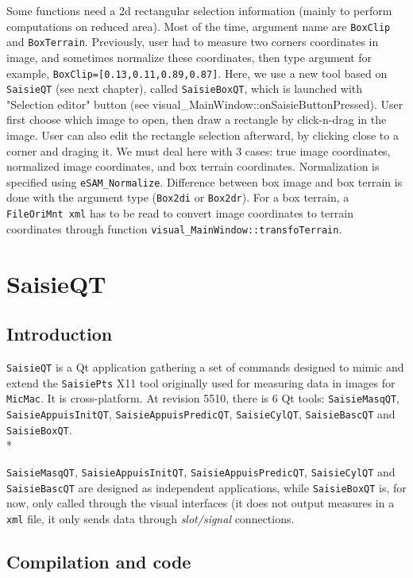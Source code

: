 \documentclass[a4paper]{book}
\begin{document}
Some functions need a 2d rectangular selection information (mainly to perform computations on reduced area). Most of the time, argument name are {\tt BoxClip} and {\tt BoxTerrain}. Previously, user had to measure two corners coordinates in image, and sometimes normalize these coordinates, then type argument for example, {\tt BoxClip=[0.13,0.11,0.89,0.87]}. Here, we use a new tool based on {\tt SaisieQT} (see next chapter), called {\tt SaisieBoxQT}, which is launched with "Selection editor" button (see visual\_MainWindow::onSaisieButtonPressed). User first choose which image to open, then draw a rectangle by click-n-drag in the image. User can also edit the rectangle selection afterward, by clicking close to a corner and draging it.
We must deal here with 3 cases: true image coordinates, normalized image coordinates, and box terrain coordinates.
Normalization is specified using {\tt eSAM\_Normalize}. Difference between box image and box terrain is done with the argument type ({\tt Box2di} or {\tt Box2dr}). For a box terrain, a {\tt FileOriMnt xml} has to be read to convert image coordinates to terrain coordinates through function {\tt visual\_MainWindow::transfoTerrain}.

\section{SaisieQT}

\subsection{Introduction}

{\tt SaisieQT} is a Qt application gathering a set of commands designed to mimic and extend the {\tt SaisiePts} X11 tool originally used for measuring data in images for {\tt MicMac}. It is cross-platform.
At revision 5510, there is 6 Qt tools: {\tt SaisieMasqQT}, {\tt SaisieAppuisInitQT}, {\tt SaisieAppuisPredicQT}, {\tt SaisieCylQT}, {\tt SaisieBascQT} and {\tt SaisieBoxQT}.\\*

{\tt SaisieMasqQT}, {\tt SaisieAppuisInitQT}, {\tt SaisieAppuisPredicQT}, {\tt SaisieCylQT} and {\tt SaisieBascQT} are designed as independent applications, while {\tt SaisieBoxQT} is, for now, only called through the visual interfaces (it does not output measures in a {\tt xml} file, it only sends data through \textit{slot/signal} connections.

\subsection{Compilation and code}
\end{document}
